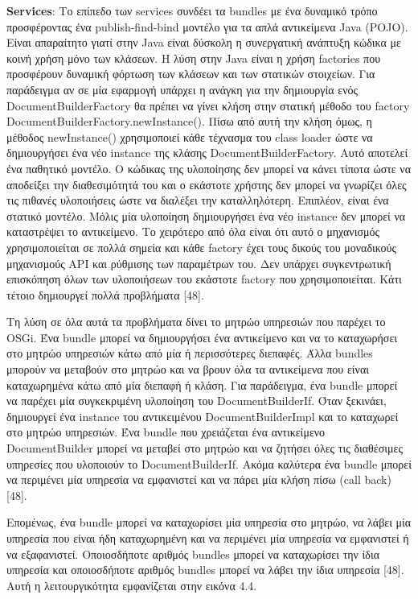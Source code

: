 	\textbf{Services}: Το επίπεδο των services συνδέει τα bundles με ένα δυναμικό τρόπο προσφέροντας ένα publish-find-bind μοντέλο για τα απλά αντικείμενα Java (POJO). Είναι απαραίτητο γιατί στην Java  είναι δύσκολη η συνεργατική ανάπτυξη κώδικα με κοινή χρήση μόνο των κλάσεων. Η λύση στην Java είναι η χρήση factories που προσφέρουν δυναμική φόρτωση των κλάσεων και των στατικών στοιχείων. Για παράδειγμα αν σε μία εφαρμογή υπάρχει η ανάγκη για την δημιουργία ενός DocumentBuilderFactory θα πρέπει να γίνει κλήση στην στατική μέθοδο του factory DocumentBuilderFactory.newInstance(). Πίσω από αυτή την κλήση όμως, η μέθοδος newInstance() χρησιμοποιεί κάθε τέχνασμα του class loader ώστε να δημιουργήσει ένα νέο instance της κλάσης DocumentBuilderFactory. Αυτό αποτελεί ένα παθητικό μοντέλο. Ο κώδικας της υλοποίησης δεν μπορεί να κάνει τίποτα ώστε να αποδείξει την διαθεσιμότητά του και ο εκάστοτε χρήστης δεν μπορεί να γνωρίζει όλες τις  πιθανές υλοποιήσεις ώστε να διαλέξει την καταλληλότερη. Επιπλέον, είναι ένα στατικό μοντέλο. Μόλις μία υλοποίηση δημιουργήσει ένα νέο instance δεν μπορεί να καταστρέψει το αντικείμενο. Το χειρότερο από όλα είναι ότι αυτό ο μηχανισμός χρησιμοποιείται σε πολλά σημεία και κάθε factory έχει τους δικούς του μοναδικούς μηχανισμούς API και ρύθμισης των παραμέτρων του. Δεν υπάρχει συγκεντρωτική επισκόπηση όλων των υλοποιήσεων του εκάστοτε factory που χρησιμοποιείται. Κάτι τέτοιο δημιουργεί πολλά προβλήματα [48].

	Τη λύση σε όλα αυτά τα προβλήματα δίνει το μητρώο υπηρεσιών που παρέχει το OSGi. Ένα bundle μπορεί να δημιουργήσει ένα αντικείμενο και να το καταχωρήσει στο μητρώο υπηρεσιών κάτω από μία ή περισσότερες διεπαφές. Άλλα bundles μπορούν να μεταβούν στο μητρώο και να βρουν όλα τα αντικείμενα που είναι καταχωρημένα κάτω από μία διεπαφή ή κλάση. Για παράδειγμα, ένα bundle μπορεί να παρέχει μία συγκεκριμένη υλοποίηση του DocumentBuilderIf. Όταν ξεκινάει, δημιουργεί ένα instance του αντικειμένου DocumentBuilderImpl και το καταχωρεί στο μητρώο υπηρεσιών. Ένα bundle που χρειάζεται ένα αντικείμενο DocumentBuilder μπορεί να μεταβεί στο μητρώο και να ζητήσει όλες τις διαθέσιμες υπηρεσίες που υλοποιούν το DocumentBuilderIf. Ακόμα καλύτερα ένα bundle μπορεί να περιμένει μία υπηρεσία να εμφανιστεί και να πάρει μία κλήση πίσω (call back) [48]. 

	Επομένως, ένα bundle μπορεί να καταχωρίσει μία υπηρεσία στο μητρώο, να λάβει μία υπηρεσία που είναι ήδη καταχωρημένη και να περιμένει μία υπηρεσία να εμφανιστεί ή να εξαφανιστεί. Οποιοσδήποτε αριθμός bundles μπορεί να καταχωρίσει την ίδια υπηρεσία και οποιοσδήποτε αριθμός bundles μπορεί να λάβει την ίδια υπηρεσία [48]. Αυτή η λειτουργικότητα εμφανίζεται στην εικόνα 4.4.


